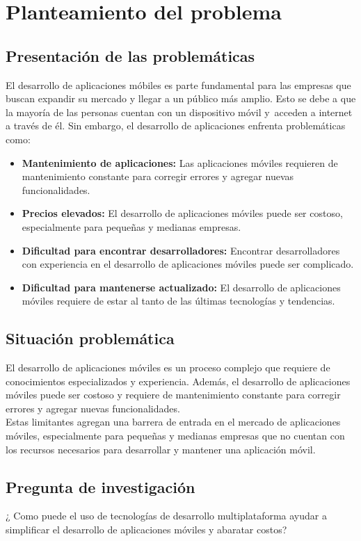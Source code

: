 \newpage
\section{Planteamiento del problema}

\subsection{Presentación de las problemáticas}
El desarrollo de aplicaciones móbiles es parte fundamental para las
empresas que buscan expandir su mercado y llegar a un público más amplio. Esto
se debe a que la mayoría de las personas cuentan con un dispositivo móvil y\
acceden a internet a través de él. Sin embargo, el desarrollo de aplicaciones
enfrenta problemáticas como:
\begin{itemize}
    \item \textbf{Mantenimiento de aplicaciones:} Las aplicaciones móviles
        requieren de mantenimiento constante para corregir errores y agregar
        nuevas funcionalidades.
    \item \textbf{Precios elevados:} El desarrollo de aplicaciones móviles
        puede ser costoso, especialmente para pequeñas y medianas empresas.
    \item \textbf{Dificultad para encontrar desarrolladores:} Encontrar
        desarrolladores con experiencia en el desarrollo de aplicaciones
        móviles puede ser complicado.
    \item \textbf{Dificultad para mantenerse actualizado:} El desarrollo de
        aplicaciones móviles requiere de estar al tanto de las últimas
        tecnologías y tendencias.
\end{itemize}

\subsection{Situación problemática}
El desarrollo de aplicaciones móviles es un proceso complejo que requiere de
conocimientos especializados y experiencia. Además, el desarrollo de
aplicaciones móviles puede ser costoso y requiere de mantenimiento constante
para corregir errores y agregar nuevas funcionalidades.\\

Estas limitantes agregan una barrera de entrada en el mercado de aplicaciones
móviles, especialmente para pequeñas y medianas empresas que no cuentan con
los recursos necesarios para desarrollar y mantener una aplicación móvil.

\subsection{Pregunta de investigación}
¿ Como puede el uso de tecnologías de desarrollo multiplataforma ayudar
a simplificar el desarrollo de aplicaciones móviles y abaratar costos?

